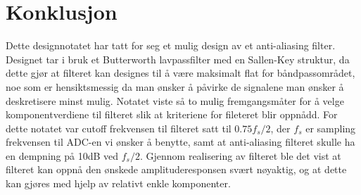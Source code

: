 \section{Konklusjon}
\label{konklusjon}

Dette designnotatet har tatt for seg et mulig design av et anti-aliasing filter. Designet tar i bruk et Butterworth lavpassfilter med en Sallen-Key struktur, da dette gjør at filteret kan designes til å være maksimalt flat for båndpassområdet, noe som er 
hensiktsmessig da man ønsker å påvirke de signalene man ønsker å deskretisere minst mulig. Notatet viste så to mulig fremgangsmåter for å velge komponentverdiene til filteret slik at kriteriene for fileteret blir oppnådd. For dette notatet var 
cutoff frekvensen til filteret satt til $0.75 f_s / 2$, der $f_s$ er sampling frekvensen til ADC-en vi ønsker å benytte, samt at anti-aliasing filteret skulle ha en dempning på 10dB ved $f_s/2$. Gjennom realisering av filteret ble det vist at filteret kan 
oppnå den ønskede amplituderesponsen svært nøyaktig, og at dette kan gjøres med hjelp av relativt enkle komponenter. 
